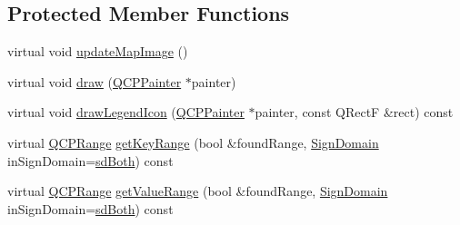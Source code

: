 \subsection*{Protected Member Functions}
\begin{DoxyCompactItemize}
\item 
virtual void \hyperlink{class_q_c_p_color_map_a5efcea591bb5486d968af520a4d43c3a}{update\+Map\+Image} ()
\item 
virtual void \hyperlink{class_q_c_p_color_map_a3b0f45a3177be9522d5e9b8cd8ae122d}{draw} (\hyperlink{class_q_c_p_painter}{Q\+C\+P\+Painter} $\ast$painter)
\item 
virtual void \hyperlink{class_q_c_p_color_map_a7d5eee89f6b8eaf2f11f1d94e32215b2}{draw\+Legend\+Icon} (\hyperlink{class_q_c_p_painter}{Q\+C\+P\+Painter} $\ast$painter, const Q\+Rect\+F \&rect) const 
\item 
virtual \hyperlink{class_q_c_p_range}{Q\+C\+P\+Range} \hyperlink{class_q_c_p_color_map_a0d89371f8707f12e22737b863f1a5126}{get\+Key\+Range} (bool \&found\+Range, \hyperlink{class_q_c_p_abstract_plottable_a661743478a1d3c09d28ec2711d7653d8}{Sign\+Domain} in\+Sign\+Domain=\hyperlink{class_q_c_p_abstract_plottable_a661743478a1d3c09d28ec2711d7653d8a082b98cfb91a7363a3b5cd17b0c1cd60}{sd\+Both}) const 
\item 
virtual \hyperlink{class_q_c_p_range}{Q\+C\+P\+Range} \hyperlink{class_q_c_p_color_map_ac1b906e05ca9b61680e61b74b3825a22}{get\+Value\+Range} (bool \&found\+Range, \hyperlink{class_q_c_p_abstract_plottable_a661743478a1d3c09d28ec2711d7653d8}{Sign\+Domain} in\+Sign\+Domain=\hyperlink{class_q_c_p_abstract_plottable_a661743478a1d3c09d28ec2711d7653d8a082b98cfb91a7363a3b5cd17b0c1cd60}{sd\+Both}) const 
\end{DoxyCompactItemize}
